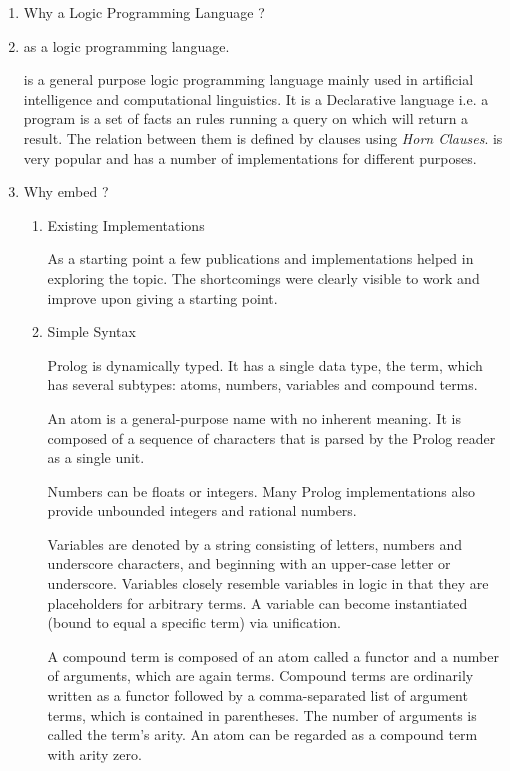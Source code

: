 \documentclass[thesis-solanki.tex]{subfiles}
\begin{document}
\begin{enumerate}
\item Why a Logic Programming Language ?

\item {} as a logic programming language.

 is a general purpose logic programming language mainly used in artificial intelligence and computational linguistics.  
It is a Declarative language i.e. a program is a set of facts an rules running a query on which will return a result. The relation
between them is defined by clauses using \textit{Horn Clauses}\cite{wikiprolog}.  is very popular and has a number of 
implementations \cite{website:comparisonofprologimplementationswiki} for different purposes. 

\item Why embed  ?

\begin{enumerate}


\item Existing Implementations

As a starting point a few publications and implementations helped in exploring the topic. The shortcomings were clearly visible to work and
improve upon giving a starting point.

\item Simple Syntax
\cite{wikiprolog}

Prolog is dynamically typed. It has a single data type, the term, which has several subtypes: atoms, numbers, variables and compound terms.

An atom is a general-purpose name with no inherent meaning. It is composed of a sequence of characters that is parsed by the Prolog reader 
as a single unit.

Numbers can be floats or integers. Many Prolog implementations also provide unbounded integers and rational numbers.

Variables are denoted by a string consisting of letters, numbers and underscore characters, and beginning with an upper-case letter or 
underscore. Variables closely resemble variables in logic in that they are placeholders for arbitrary terms. A variable can become 
instantiated (bound to equal a specific term) via unification.

A compound term is composed of an atom called a functor and a number of arguments, which are again terms. Compound terms are ordinarily 
written as a functor followed by a comma-separated list of argument terms, which is contained in parentheses. The number of arguments is 
called the term's arity. An atom can be regarded as a compound term with arity zero.


\end{enumerate}
\end{enumerate}
\end{document}

